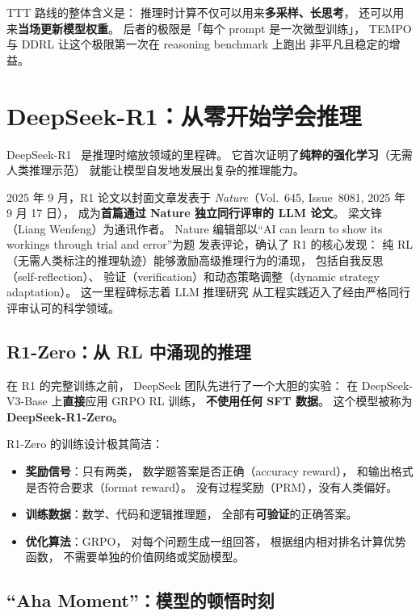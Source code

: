 TTT 路线的整体含义是：
推理时计算不仅可以用来\textbf{多采样、长思考}，
还可以用来\textbf{当场更新模型权重}。
后者的极限是「每个 prompt 是一次微型训练」，
TEMPO 与 DDRL 让这个极限第一次在 reasoning benchmark 上跑出
非平凡且稳定的增益。


\section{DeepSeek-R1：从零开始学会推理}

DeepSeek-R1~\cite{deepseekr1} 是推理时缩放领域的里程碑。
它首次证明了\textbf{纯粹的强化学习}（无需人类推理示范）
就能让模型自发地发展出复杂的推理能力。

2025 年 9 月，R1 论文以封面文章发表于
\textit{Nature}（Vol.~645, Issue~8081, 2025 年 9 月 17 日），
成为\textbf{首篇通过 Nature 独立同行评审的 LLM 论文}。
梁文锋（Liang Wenfeng）为通讯作者。
Nature 编辑部以“AI can learn to show its workings through trial and error”为题
发表评论，确认了 R1 的核心发现：
纯 RL（无需人类标注的推理轨迹）能够激励高级推理行为的涌现，
包括自我反思（self-reflection）、
验证（verification）和动态策略调整（dynamic strategy adaptation）。
这一里程碑标志着 LLM 推理研究
从工程实践迈入了经由严格同行评审认可的科学领域。

\subsection{R1-Zero：从 RL 中涌现的推理}

在 R1 的完整训练之前，
DeepSeek 团队先进行了一个大胆的实验：
在 DeepSeek-V3-Base 上\textbf{直接}应用 GRPO RL 训练，
\textbf{不使用任何 SFT 数据}。
这个模型被称为 \textbf{DeepSeek-R1-Zero}。

R1-Zero 的训练设计极其简洁：
\begin{itemize}[noitemsep]
  \item \textbf{奖励信号}：只有两类，
        数学题答案是否正确（accuracy reward），
        和输出格式是否符合要求（format reward）。
        没有过程奖励（PRM），没有人类偏好。
  \item \textbf{训练数据}：数学、代码和逻辑推理题，
        全部有\textbf{可验证}的正确答案。
  \item \textbf{优化算法}：GRPO，
        对每个问题生成一组回答，
        根据组内相对排名计算优势函数，
        不需要单独的价值网络或奖励模型。
\end{itemize}

\subsection{“Aha Moment”：模型的顿悟时刻}

